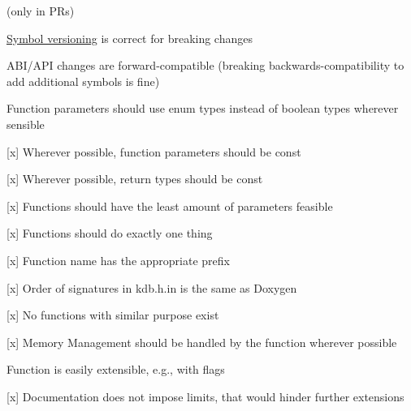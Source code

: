 (only in P\+Rs)


\begin{DoxyItemize}
\item \hyperlink{doc_dev_symbol-versioning_md}{Symbol versioning} is correct for breaking changes
\item A\+B\+I/\+A\+PI changes are forward-\/compatible (breaking backwards-\/compatibility to add additional symbols is fine)
\end{DoxyItemize}


\begin{DoxyItemize}
\item Function parameters should use enum types instead of boolean types wherever sensible
\item \mbox{[}x\mbox{]} Wherever possible, function parameters should be {\ttfamily const}
\item \mbox{[}x\mbox{]} Wherever possible, return types should be {\ttfamily const}
\item \mbox{[}x\mbox{]} Functions should have the least amount of parameters feasible
\end{DoxyItemize}


\begin{DoxyItemize}
\item \mbox{[}x\mbox{]} Functions should do exactly one thing
\item \mbox{[}x\mbox{]} Function name has the appropriate prefix
\item \mbox{[}x\mbox{]} Order of signatures in kdb.\+h.\+in is the same as Doxygen
\item \mbox{[}x\mbox{]} No functions with similar purpose exist
\end{DoxyItemize}


\begin{DoxyItemize}
\item \mbox{[}x\mbox{]} Memory Management should be handled by the function wherever possible
\end{DoxyItemize}


\begin{DoxyItemize}
\item Function is easily extensible, e.\+g., with flags
\item \mbox{[}x\mbox{]} Documentation does not impose limits, that would hinder further extensions
\end{DoxyItemize}


